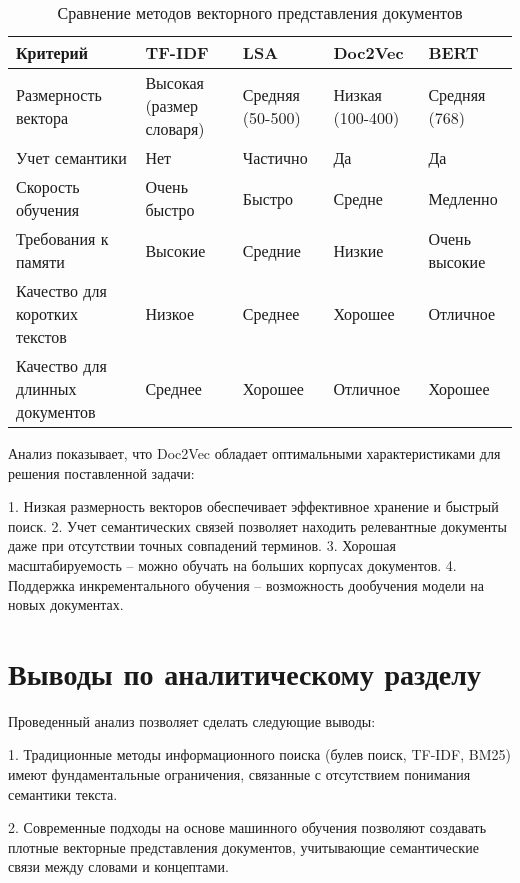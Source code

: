 	\begin{table}[H]
		\caption{Сравнение методов векторного представления документов}
		\begin{center}
			\begin{tabular}{|p{3cm}|p{2.5cm}|p{2.5cm}|p{2.5cm}|p{2.5cm}|}
				\hline
				\textbf{Критерий} & \textbf{TF-IDF} & \textbf{LSA} & \textbf{Doc2Vec} & \textbf{BERT} \\
				\hline
				Размерность вектора & Высокая (размер словаря) & Средняя (50-500) & Низкая (100-400) & Средняя (768) \\
				\hline
				Учет семантики & Нет & Частично & Да & Да \\
				\hline
				Скорость обучения & Очень быстро & Быстро & Средне & Медленно \\
				\hline
				Требования к памяти & Высокие & Средние & Низкие & Очень высокие \\
				\hline
				Качество для коротких текстов & Низкое & Среднее & Хорошее & Отличное \\
				\hline
				Качество для длинных документов & Среднее & Хорошее & Отличное & Хорошее \\
				\hline
			\end{tabular}
		\end{center}
	\end{table}
	
	Анализ показывает, что Doc2Vec обладает оптимальными характеристиками для решения поставленной задачи:
	
	1. Низкая размерность векторов обеспечивает эффективное хранение и быстрый поиск.
	2. Учет семантических связей позволяет находить релевантные документы даже при отсутствии точных совпадений терминов.
	3. Хорошая масштабируемость – можно обучать на больших корпусах документов.
	4. Поддержка инкрементального обучения – возможность дообучения модели на новых документах.
	
	\section{Выводы по аналитическому разделу}
	
	Проведенный анализ позволяет сделать следующие выводы:
	
	1. Традиционные методы информационного поиска (булев поиск, TF-IDF, BM25) имеют фундаментальные ограничения, связанные с отсутствием понимания семантики текста.
	
	2. Современные подходы на основе машинного обучения позволяют создавать плотные векторные представления документов, учитывающие семантические связи между словами и концептами.
	
